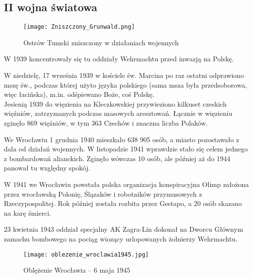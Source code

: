 \documentclass{article}
\begin{document}
\subsection{II wojna światowa}

\begin{wrapfigure}{r}{0.42\textwidth} 
\begin{center}
\vspace{-20pt}
\texttt{[image: Zniszczony\_Grunwald.png]}
\end{center}
\vspace{-20pt}
\caption{Ostrów Tumski zniszczony w działaniach wojennych}
\vspace{-10pt}
\end{wrapfigure}

W 1939 koncentrowały się tu oddziały Wehrmachtu przed inwazją na Polskę.

W niedzielę, 17 września 1939 w kościele św. Marcina po raz ostatni odprawiono mszę św., podczas której użyto języka polskiego (sama msza była przedsoborowa, więc łacińska), m.in. odśpiewano Boże, coś Polskę.
\\
Jesienią 1939 do więzienia na Kleczkowskiej przywieziono kilkuset czeskich więźniów, zatrzymanych podczas masowych aresztowań. Łącznie w więzieniu zginęło 869 więźniów, w tym 363 Czechów i znaczna liczba Polaków.

We Wrocławiu 1 grudnia 1940 mieszkało 638 905 osób, a miasto pozostawało z dala od działań wojennych. W listopadzie 1941 wprawdzie stało się celem jednego z bombardowań alianckich. Zginęło wówczas 10 osób, ale później aż do 1944 panował tu względny spokój.

W 1941 we Wrocławiu powstała polska organizacja konspiracyjna Olimp założona przez wrocławską Polonię, Ślązaków i robotników przymusowych z Rzeczypospolitej. Rok później została rozbita przez Gestapo, a 20 osób skazano na karę śmierci.

23 kwietnia 1943 oddział specjalny AK Zagra-Lin dokonał na Dworcu Głównym zamachu bombowego na pociąg wiozący urlopowanych żołnierzy Wehrmachtu.

\begin{wrapfigure}{r}{0.42\textwidth} 
\begin{center}
\vspace{-20pt}
\texttt{[image: oblezenie\_wroclawia1945.jpg]}
\end{center}
\vspace{-20pt}
\caption{Oblężenie Wrocławia – 6 maja 1945}
\vspace{-10pt}
\end{wrapfigure}
\end{document}
